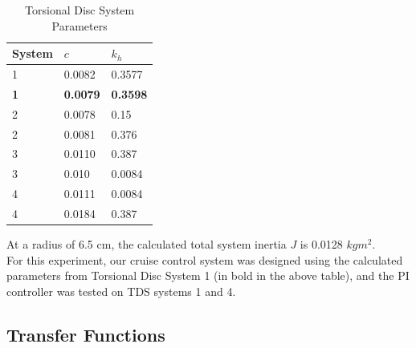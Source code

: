 \documentclass[11pt,titlepage]{article}
\begin{document}
    
            \begin{table}[h!]
            \centering
            \begin{tabular}{|m{4cm}|m{3cm}|m{3cm}|} 
                \hline
                System & $c$ &$k_h$ \\ 
                \hline
                1 &  0.0082 & 0.3577\\
                \hline
                \textbf{1} & \textbf{0.0079} & \textbf{0.3598}\\
                \hline
                2 & 0.0078 & 0.15\\
                \hline
                2 & 0.0081 & 0.376\\
                \hline
                3 & 0.0110 & 0.387\\
                \hline
                3 & 0.010 & 0.0084\\
                \hline
                4 & 0.0111 & 0.0084\\
                \hline
                4 & 0.0184 & 0.387\\
                \hline
            \end{tabular}
            \caption{Torsional Disc System Parameters} \label{table:TDS_param}
        \end{table}
        
        \noindent At a radius of 6.5 cm, the calculated total system inertia $J$ is 0.0128 $kg m^2$.\\
        
        \noindent For this experiment, our cruise control system was designed using the calculated parameters from Torsional Disc System 1 (in bold in the above table), and the PI controller was tested on TDS systems 1 and 4.

    \subsection{Transfer Functions} \label{sec:tf}
    
\end{document}
